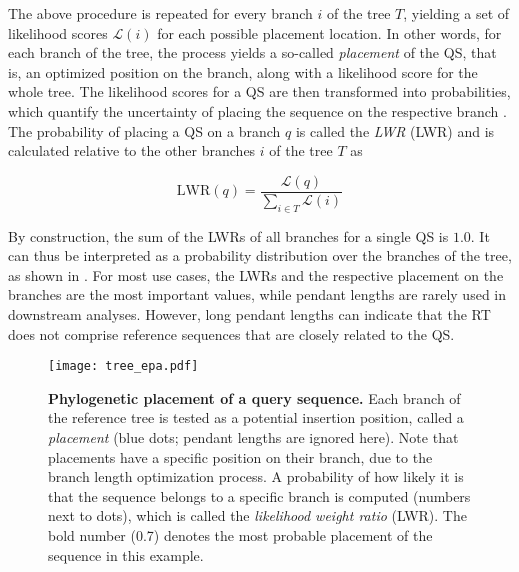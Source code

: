 The above procedure is repeated for every branch $i$ of the tree $T$,
yielding a set of likelihood scores $\mathcal{L}(i)$ for each possible placement location.
In other words, for each branch of the tree, the process yields a so-called \emph{placement} of the \ac{QS},
that is, an optimized position on the branch, along with a likelihood score for the whole tree.
The likelihood scores for a \ac{QS} are then transformed into probabilities,
which quantify the uncertainty of placing the sequence on the respective branch \cite{Strimmer2002,VonMering2007}.
The probability of placing a \ac{QS} on a branch $q$ is called the \emph{\acl{LWR}}
(\acs{LWR}) %
and is calculated relative to the other branches $i$ of the tree $T$ as

\begin{equation}
    \label{ch:Foundations:sec:PhylogeneticPlacement:eq:LWR}
    \mbox{LWR}(q) =  \frac{ \mathcal{L}( q )}{ \sum_{i \in T} \mathcal{L}( i )}
\end{equation}

By construction, the sum of the \acp{LWR} of all branches for a single \ac{QS} is $1.0$.
It can thus be interpreted as a probability distribution over the branches of the tree,
as shown in .
For most use cases, the \acp{LWR} and the respective placement on the branches are the most important values,
while pendant lengths are rarely used in downstream analyses.
However, long pendant lengths can indicate that the \ac{RT} does not comprise reference sequences
that are closely related to the \ac{QS}.

\begin{figure}[hpbt]
    \centering
    \texttt{[image: tree\_epa.pdf]}
    \caption[Phylogenetic placement of a query sequence]{
        \textbf{Phylogenetic placement of a query sequence.}
        Each branch of the reference tree is tested as a potential insertion position, called a \emph{placement}
        (blue dots; pendant lengths are ignored here).
        Note that placements have a specific position on their branch, due to the branch length optimization process.
        A probability of how likely it is that the sequence belongs to a specific branch is computed
        (numbers next to dots),
        which is called the \emph{likelihood weight ratio} (LWR).
        The bold number (0.7) denotes the most probable placement of the sequence in this example.
    }
    \label{fig:tree_epa}
\end{figure}

